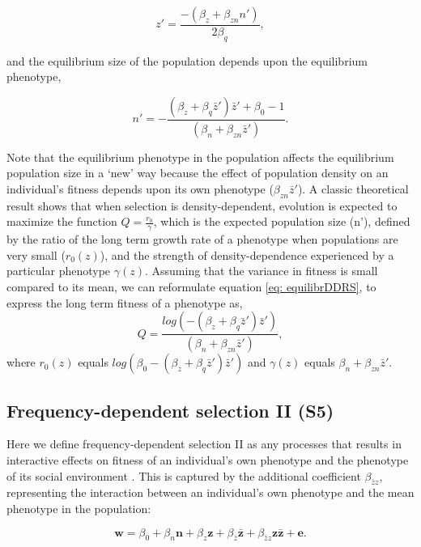 \documentclass{article}
\begin{document}
\begin{equation} 
z'=\frac{-(\beta_{z}+\beta_{zn}n')}{2\beta_{q}},
\end{equation} 

and the equilibrium size of the population depends upon the equilibrium phenotype,

\begin{equation} \label{eq: equilibrium DDRS}
		n' = -\frac{(\beta_{z}  +  \beta_{q}\bar{z}')\bar{z}'+\beta_{0} -1}{(\beta_{n} +  \beta_{zn} \bar{z}')}.
\end{equation}

\noindent Note that the equilibrium phenotype in the population affects the equilibrium population size in a `new' way because the effect of population density on an individual's fitness depends upon its own phenotype ($\beta_{zn} \bar{z}'$). A classic theoretical result \citep{MacArthur1962, Engen2013} shows that when selection is density-dependent, evolution is expected to maximize the function $Q=\frac{r_0}{\gamma}$, which is the expected population size (n'), defined by the ratio of the long term growth rate of a phenotype when populations are very small ($r_0(z)$), and the strength of density-dependence experienced by a particular phenotype $\gamma(z)$.  Assuming that the variance in fitness is small compared to its mean, we can reformulate equation \ref{eq: equilibrDDRS}, to express the long term fitness of a phenotype as,  $$Q=\frac{log(-(\beta_{z}  +  \beta_{q}\bar{z}')\bar{z}')}{(\beta_{n} +  \beta_{zn} \bar{z}')},$$ where  $r_0(z)$ equals $log(\beta_{0}-(\beta_{z}  +  \beta_{q}\bar{z}')\bar{z}')$ and $\gamma(z)$ equals $\beta_{n} + \beta_{zn} \bar{z}'$.
 
\subsection{Frequency-dependent selection II (S5)}

 Here we define frequency-dependent selection II as any processes that results in interactive effects on fitness of an individual's own phenotype and the phenotype of its social environment \citep{Araya-Ajoy2020}. This is captured by the additional coefficient $\beta_{\bar{z}z}$, representing the interaction between an individual's own phenotype and the mean phenotype in the population:  

\begin{equation} \label{eq: FDS}
\mathbf{w}=\beta_{0} +\beta_{n} \mathbf{n} + \beta_{z} \mathbf{z}+ \beta_{\bar{z}} \mathbf{\bar{z}}  + \beta_{\bar{z}z} \mathbf{z\bar{z}}  +  \mathbf{e}.
\end{equation}
\end{document}
